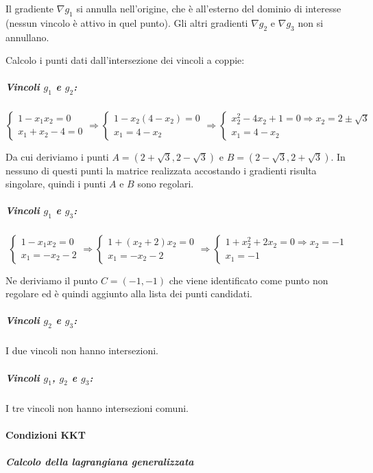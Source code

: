 \documentclass[\main/main.tex]{subfiles}
\begin{document}
Il gradiente $ \nabla g_1$ si annulla nell'origine, che è all'esterno del dominio di interesse (nessun vincolo è attivo in quel punto). Gli altri gradienti $ \nabla g_2$ e $\nabla g_3$ non si annullano.

Calcolo i punti dati dall'intersezione dei vincoli a coppie:

\subparagraph*{Vincoli $g_1$ e $g_2$:}

\[
  \begin{cases}
    1-x_1x_2 = 0 \\
    x_1 + x_2 - 4 = 0
  \end{cases}
  \Rightarrow
  \begin{cases}
    1-x_2(4 - x_2) = 0 \\
    x_1  = 4 - x_2
  \end{cases}
  \Rightarrow
  \begin{cases}
    x^2_2 - 4x_2 +1 = 0 \Rightarrow x_2 = 2 \pm \sqrt{3} \\
    x_1  = 4 - x_2
  \end{cases}
\]

Da cui deriviamo i punti $A = (2 + \sqrt{3}, 2 - \sqrt{3})$ e $B = (2 - \sqrt{3}, 2 + \sqrt{3})$. In nessuno di questi punti la matrice realizzata accostando i gradienti risulta singolare, quindi i punti $A$ e $B$ sono regolari.

\subparagraph*{Vincoli $g_1$ e $g_3$:}

\[
  \begin{cases}
    1-x_1x_2 = 0 \\
    x_1  = -x_2 - 2
  \end{cases}
  \Rightarrow
  \begin{cases}
    1+(x_2 + 2)x_2 = 0 \\
    x_1  = -x_2 - 2
  \end{cases}
  \Rightarrow
  \begin{cases}
    1+x^2_2 +2x_2 = 0 \Rightarrow x_2 = -1 \\
    x_1  = -1
  \end{cases}
\]

Ne deriviamo il punto $C = (-1, -1)$ che viene identificato come punto non regolare ed è quindi aggiunto alla lista dei punti candidati.

\subparagraph*{Vincoli $g_2$ e $g_3$:}
I due vincoli non hanno intersezioni.

\subparagraph*{Vincoli $g_1$, $g_2$ e $g_3$:}
I tre vincoli non hanno intersezioni comuni.

\paragraph*{Condizioni KKT}
\subparagraph*{Calcolo della lagrangiana generalizzata}
\end{document}

